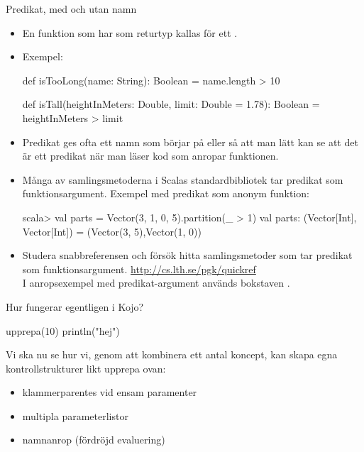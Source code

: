 \begin{Slide}{Predikat, med och utan namn}
	\begin{itemize}\SlideFontSmall
		\item En funktion som har  som returtyp kallas för ett .
		\item Exempel:
		      \begin{Code}
			      def isTooLong(name: String): Boolean = name.length > 10

			      def isTall(heightInMeters: Double, limit: Double = 1.78): Boolean =
			      heightInMeters > limit
		      \end{Code}
		\item Predikat ges ofta ett namn som börjar på  eller  så att man lätt kan se att det är ett predikat när man läser kod som anropar funktionen.
		\item Många av samlingsmetoderna i Scalas standardbibliotek tar predikat som funktionsargument. Exempel med predikat som anonym funktion:
		      \begin{REPLnonum}
			      scala> val parts = Vector(3, 1, 0, 5).partition(_ > 1)
			      val parts: (Vector[Int], Vector[Int]) =
			      (Vector(3, 5),Vector(1, 0))
		      \end{REPLnonum}
		\item Studera snabbreferensen och försök hitta samlingsmetoder som tar predikat som funktionsargument. \url{http://cs.lth.se/pgk/quickref} \\I anropsexempel med predikat-argument används bokstaven .
	\end{itemize}
\end{Slide}


\begin{Slide}{Hur fungerar egentligen  i Kojo?}
	\begin{Code}[basicstyle=\ttfamily\SlideFontSize{14}{16}]
		upprepa(10) {
				println("hej")
			}
	\end{Code}

	\pause
	Vi ska nu se hur vi, genom att kombinera ett antal koncept, kan skapa egna kontrollstrukturer likt upprepa ovan:
	\begin{itemize}
		\item klammerparentes vid ensam paramenter
		\item multipla parameterlistor
		\item namnanrop (fördröjd evaluering)
	\end{itemize}
\end{Slide}

